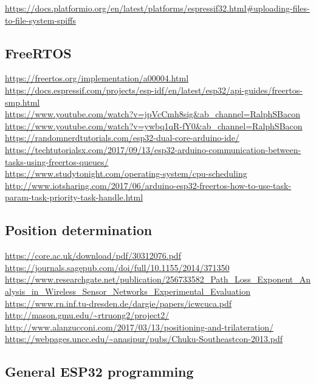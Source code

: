 \documentclass[11pt,a4paper]{article}
\begin{document}
\url{https://docs.platformio.org/en/latest/platforms/espressif32.html#uploading-files-to-file-system-spiffs}


\subsection{FreeRTOS}


\url{https://freertos.org/implementation/a00004.html}\\[4pt]
\url{https://docs.espressif.com/projects/esp-idf/en/latest/esp32/api-guides/freertos-smp.html}\\[4pt]
\url{https://www.youtube.com/watch?v=jpVcCmh8sig&ab_channel=RalphSBacon}\\[4pt]
\url{https://www.youtube.com/watch?v=ywbq1qR-fY0&ab_channel=RalphSBacon}\\[4pt]
\url{https://randomnerdtutorials.com/esp32-dual-core-arduino-ide/}\\[4pt]
\url{https://techtutorialsx.com/2017/09/13/esp32-arduino-communication-between-tasks-using-freertos-queues/}\\[4pt]
\url{https://www.studytonight.com/operating-system/cpu-scheduling}\\[4pt]
\url{http://www.iotsharing.com/2017/06/arduino-esp32-freertos-how-to-use-task-param-task-priority-task-handle.html}


\subsection{Position determination}


\url{https://core.ac.uk/download/pdf/30312076.pdf}\\[4pt]
\url{https://journals.sagepub.com/doi/full/10.1155/2014/371350}\\[4pt]
\url{https://www.researchgate.net/publication/256733582_Path_Loss_Exponent_Analysis_in_Wireless_Sensor_Networks_Experimental_Evaluation}\\[4pt]
\url{https://www.rn.inf.tu-dresden.de/dargie/papers/icwcuca.pdf}\\[4pt]
\url{http://mason.gmu.edu/~rtruong2/project2/}\\[4pt]
\url{http://www.alanzucconi.com/2017/03/13/positioning-and-trilateration/}\\[4pt]
\url{https://webpages.uncc.edu/~anasipur/pubs/Chuku-Southeastcon-2013.pdf}


\subsection{General ESP32 programming}
\end{document}
